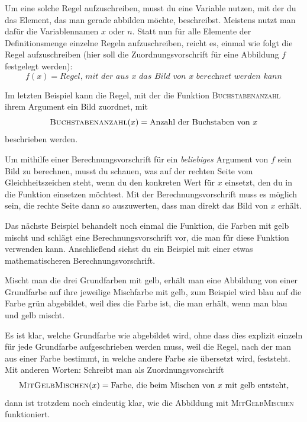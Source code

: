 \documentclass[../../main.tex]{subfiles}
\begin{document}
Um eine solche Regel aufzuschreiben, musst du eine Variable nutzen, mit der du das Element, das man gerade abbilden möchte, beschreibst. Meistens nutzt man dafür die Variablennamen $x$ oder $n$. Statt nun für alle Elemente der Definitionsmenge einzelne Regeln aufzuschreiben, reicht es, einmal wie folgt die Regel aufzuschreiben (hier soll die Zuordnungsvorschrift für eine Abbildung $f$ festgelegt werden): 
\[f(x)=\textit{Regel, mit der aus $x$ das Bild von $x$ berechnet werden kann}\]

\begin{example}{}
    Im letzten Beispiel kann die Regel, mit der die Funktion \textsc{Buchstabenanzahl} ihrem Argument ein Bild zuordnet, mit
    \[\textsc{Buchstabenanzahl}(x)=\text{Anzahl~der~Buchstaben~von~}x\]
    beschrieben werden.
\end{example}

Um mithilfe einer Berechnungsvorschrift für ein \emph{beliebiges} Argument von $f$ sein Bild zu berechnen, musst du schauen, was auf der rechten Seite vom Gleichheitszeichen steht, wenn du den konkreten Wert für $x$ einsetzt, den du in die Funktion einsetzen möchtest. Mit der Berechnungsvorschrift muss es möglich sein, die rechte Seite dann so auszuwerten, dass man direkt das Bild von $x$ erhält.

Das nächste Beispiel behandelt noch einmal die Funktion, die Farben mit gelb mischt und schlägt eine Berechnungsvorschrift vor, die man für diese Funktion verwenden kann. Anschließend siehst du ein Beispiel mit einer etwas mathematischeren Berechnungsvorschrift.

\begin{example}{}
    \parpic[r]{
    }
    
    Mischt man die drei Grundfarben mit gelb, erhält man eine Abbildung von einer Grundfarbe auf ihre jeweilige Mischfarbe mit gelb, zum Beispiel wird blau auf die Farbe grün abgebildet, weil dies die Farbe ist, die man erhält, wenn man blau und gelb mischt.
    
    Es ist klar, welche Grundfarbe wie abgebildet wird, ohne dass dies explizit einzeln für jede Grundfarbe aufgeschrieben werden muss, weil die Regel, nach der man aus einer Farbe bestimmt, in welche andere Farbe sie übersetzt wird, feststeht. Mit anderen Worten: Schreibt man als Zuordnungsvorschrift
    \[\textsc{MitGelbMischen}(x)=\text{Farbe, die beim Mischen von } x \text{ mit gelb entsteht},\]
    dann ist trotzdem noch eindeutig klar, wie die Abbildung mit \textsc{MitGelbMischen} funktioniert.
\end{example}
\end{document}
